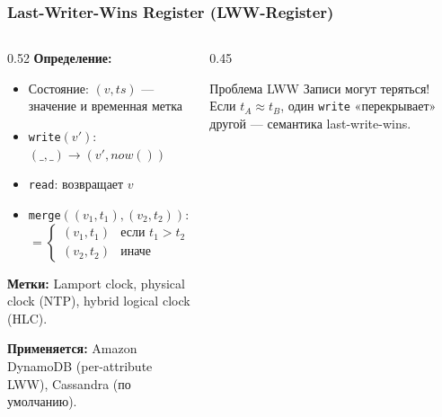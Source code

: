 \documentclass{beamer}
\newcommand{\ts}{\mathit{ts}}
\begin{document}
\begin{frame}
\frametitle{Last-Writer-Wins Register (LWW-Register)}

\begin{columns}
\begin{column}{0.52\textwidth}
\textbf{Определение:}
\begin{itemize}
  \item Состояние: $(v, \ts)$ — значение и временная метка
  \item \texttt{write}$(v')$: $(\_, \_) \to (v', \mathit{now}())$
  \item \texttt{read}: возвращает $v$
  \item \texttt{merge}$((v_1,t_1),(v_2,t_2))$:
  \[
    = \begin{cases}(v_1,t_1) & \text{если } t_1 > t_2 \\ (v_2,t_2) & \text{иначе}\end{cases}
  \]
\end{itemize}

\medskip
\textbf{Метки:} Lamport clock, physical clock (NTP), hybrid logical clock (HLC).

\medskip
\textbf{Применяется:} Amazon DynamoDB (per-attribute LWW), Cassandra (по умолчанию).
\end{column}
\begin{column}{0.45\textwidth}

\bigskip
\begin{alertblock}{Проблема LWW}
\small Записи могут теряться! Если $t_A \approx t_B$, один \texttt{write} «перекрывает» другой — семантика last-write-wins.
\end{alertblock}
\end{column}
\end{columns}

\end{frame}
\end{document}
